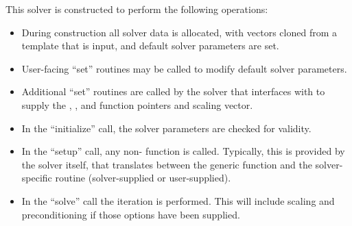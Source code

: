 This solver is constructed to perform the following operations:
\begin{itemize}
\item During construction all {\nvector} solver data is allocated,
  with vectors cloned from a template {\nvector} that is input, and
  default solver parameters are set.
\item User-facing ``set'' routines may be called to modify default
  solver parameters.
\item Additional ``set'' routines are called by the {\sundials} solver
  that interfaces with {\sunlinsolpcg} to supply the 
  , , and  function pointers and
   scaling vector.
\item In the ``initialize'' call, the solver parameters are checked
  for validity.
\item In the ``setup'' call, any non-  function is
  called.  Typically, this is provided by the {\sundials} solver
  itself, that translates between the generic  function and
  the solver-specific routine (solver-supplied or user-supplied).
\item In the ``solve'' call the {\pcg} iteration is performed.  This
  will include scaling and preconditioning if those options have been
  supplied.
\end{itemize}

